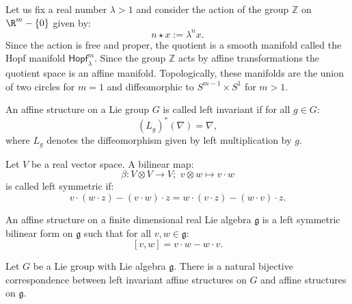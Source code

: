 \begin{example}
	Let us fix a real number $\lambda>1$ and consider the action of the group $\mathbb{Z}$ on $\R^m-\{0\}$ given by:
	\[ n \star x:= \lambda^n x.\]
	Since the action is free and proper, the quotient is a smooth manifold called the Hopf manifold $\mathsf{Hopf}^m_\lambda$. Since the group $\mathbb{Z}$ acts by affine transformations the quotient space is an affine manifold. Topologically, these manifolds are the union of two circles for $m=1$ and diffeomorphic to $S^{m-1}\times S^1$ for $m>1$.
\end{example}


\begin{definition}
	An affine structure on a Lie group $G$ is called left invariant if for all $g \in G$:
	\[ (L_g)^*(\nabla)=\nabla,\]
	where $L_g$ denotes the diffeomorphism given by left multiplication by $g$.
\end{definition}

\begin{definition}
	Let $V$ be a real vector space. A bilinear map:
	\[\beta: V \otimes V \rightarrow V;\,\, v \otimes w \mapsto v\cdot w\]
	is called left symmetric if:
	\[ v\cdot (w \cdot z)-(v\cdot w) \cdot z= w\cdot (v \cdot z)-(w\cdot v)\cdot z.\]
\end{definition}


\begin{definition}
	An affine structure on a finite dimensional real Lie algebra $\mathfrak{g}$ is a left symmetric bilinear form on $\mathfrak{g}$ such that for all $v,w \in \mathfrak{g}$:
	\[ [v,w]=v\cdot w- w \cdot v.\]
\end{definition}

\begin{lemma}
	Let $G$ be a Lie group with Lie algebra $\mathfrak{g}$. There is a natural bijective correspondence between
	left invariant affine structures on $G$ and affine structures on $\mathfrak{g}$.
\end{lemma}

